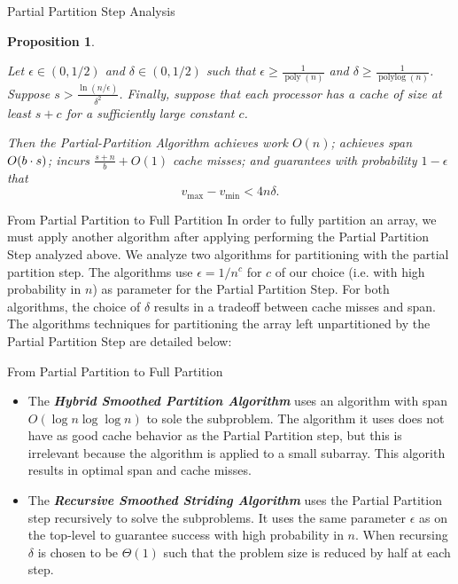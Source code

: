 \documentclass{beamer}
\DeclarePairedDelimiter{\paren}{(}{)}
\newcommand{\poly}{\operatorname{poly}}
\newcommand{\polylog}{\operatorname{polylog}}
\newcommand{\defn}[1]       {{\textit{\textbf{\boldmath #1}}}}
\newtheorem{prop}{Proposition}
\begin{document}
\begin{frame}[t]{Partial Partition Step Analysis}
\begin{prop}
  \label{prop:generalResult}
  
  Let $\epsilon \in (0, 1/2)$ and $\delta \in (0, 1/2)$ such that
  $\epsilon \ge \frac{1}{\poly(n)}$ and $\delta \ge
  \frac{1}{\polylog(n)}$. Suppose $s > \frac{\ln
    (n/\epsilon)}{\delta^2}$. Finally, suppose that each processor has
  a cache of size at least $s + c$ for a sufficiently large constant
  $c$.

  Then the Partial-Partition Algorithm achieves work $O(n)$; achieves
  span $O\paren*{b \cdot s}$; incurs $\frac{s+n}{b} + O(1)$ cache
  misses; and guarantees with probability $1 - \epsilon$ that
  $$v_{\text{max}}-v_{\text{min}} < 4 n \delta.$$
\end{prop}
\end{frame}

\begin{frame}[t]{From Partial Partition to Full Partition}
In order to fully partition an array, we must apply another algorithm after applying performing the Partial Partition Step analyzed above. 
We analyze two algorithms for partitioning with the partial partition step.
The algorithms use $\epsilon = 1/n^c$ for $c$ of our choice (i.e. with high probability in $n$) as parameter for the Partial Partition Step. 
For both algorithms, the choice of $\delta$ results in a tradeoff between cache misses and span. 
The algorithms techniques for partitioning the array left unpartitioned by the Partial Partition Step are detailed below:
\end{frame}

\begin{frame}[t]{From Partial Partition to Full Partition}
\begin{itemize}
	\item The \defn{Hybrid Smoothed Partition Algorithm} uses an algorithm with span $O(\log n \log \log n)$ to sole the subproblem. The algorithm it uses does not have as good cache behavior as the Partial Partition step, but this is irrelevant because the algorithm is applied to a small subarray. This algorith results in optimal span and cache misses.
	\item The \defn{Recursive Smoothed Striding Algorithm} uses the Partial Partition step recursively to solve the subproblems. It uses the same parameter $\epsilon$ as on the top-level to guarantee success with high probability in $n$. When recursing $\delta$ is chosen to be $\Theta(1)$ such that the problem size is reduced by half at each step.
\end{itemize}
\end{frame}
\end{document}
